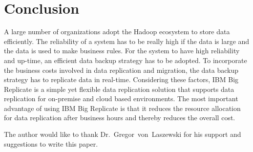 \section{Conclusion}
A large number of organizations adopt the Hadoop ecosystem to store data
efficiently. The reliability of a system has to be really high if the data is
large and the data is used to make business rules. For the system to have high
reliability and up-time, an efficient data backup strategy has to be adopted. To
incorporate the business costs involved in data replication and migration, the
data backup strategy has to replicate data in real-time. Considering these
factors, IBM Big Replicate is a simple yet flexible data replication solution 
that supports data replication for on-premise and cloud based environments. 
The most important advantage of using IBM Big Replicate is that it reduces the
resource allocation for data replication after business hours and thereby 
reduces the overall cost.

\begin{acks}

  The author would like to thank Dr.~Gregor~von~Laszewski for his
  support and suggestions to write this paper.

\end{acks}


 


